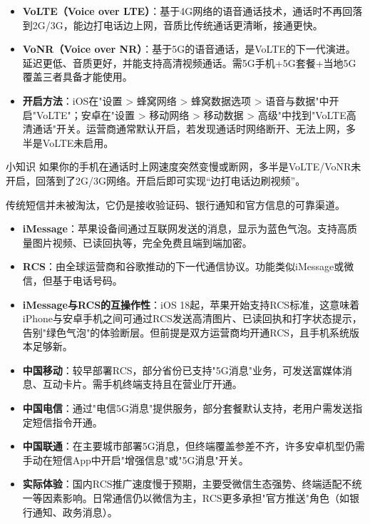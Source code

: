 
\begin{itemize}
  \item \textbf{VoLTE（Voice over LTE）}：基于4G网络的语音通话技术，通话时不再回落到2G/3G，能边打电话边上网，音质比传统通话更清晰，接通更快。
  \item \textbf{VoNR（Voice over NR）}：基于5G的语音通话，是VoLTE的下一代演进。延迟更低、音质更好，并能支持高清视频通话。需5G手机+5G套餐+当地5G覆盖三者具备才能使用。
  \item \textbf{开启方法}：iOS在"设置 > 蜂窝网络 > 蜂窝数据选项 > 语音与数据"中开启"VoLTE"；安卓在"设置 > 移动网络 > 移动数据 > 高级"中找到"VoLTE高清通话"开关。运营商通常默认开启，若发现通话时网络断开、无法上网，多半是VoLTE未启用。
\end{itemize}

\begin{tcbinfo}{小知识}
如果你的手机在通话时上网速度突然变慢或断网，多半是VoLTE/VoNR未开启，回落到了2G/3G网络。开启后即可实现“边打电话边刷视频”。

\end{tcbinfo}


传统短信并未被淘汰，它仍是接收验证码、银行通知和官方信息的可靠渠道。

\begin{itemize}
  \item \textbf{iMessage}：苹果设备间通过互联网发送的消息，显示为蓝色气泡。支持高质量图片视频、已读回执等，完全免费且端到端加密。
  \item \textbf{RCS}：由全球运营商和谷歌推动的下一代通信协议。功能类似iMessage或微信，但基于电话号码。
  \item \textbf{iMessage与RCS的互操作性}：iOS 18起，苹果开始支持RCS标准，这意味着iPhone与安卓手机之间可通过RCS发送高清图片、已读回执和打字状态提示，告别"绿色气泡"的体验断层。但前提是双方运营商均开通RCS，且手机系统版本足够新。
\end{itemize}


\begin{itemize}
  \item \textbf{中国移动}：较早部署RCS，部分省份已支持"5G消息"业务，可发送富媒体消息、互动卡片。需手机终端支持且在营业厅开通。
  \item \textbf{中国电信}：通过"电信5G消息"提供服务，部分套餐默认支持，老用户需发送指定短信指令开通。
  \item \textbf{中国联通}：在主要城市部署5G消息，但终端覆盖参差不齐，许多安卓机型仍需手动在短信App中开启"增强信息"或"5G消息"开关。
  \item \textbf{实际体验}：国内RCS推广速度慢于预期，主要受微信生态强势、终端适配不统一等因素影响。日常通信仍以微信为主，RCS更多承担"官方推送"角色（如银行通知、政务消息）。
\end{itemize}

